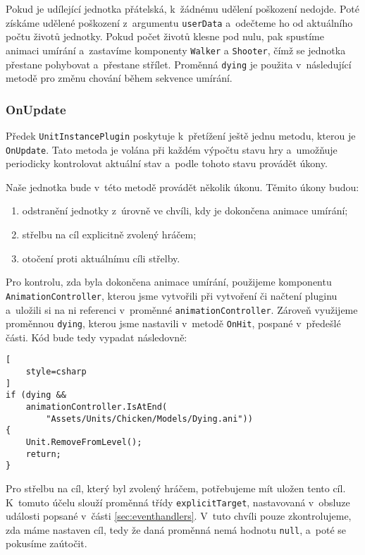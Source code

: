 Pokud je udílející jednotka přátelská, k~žádnému udělení poškození nedojde. Poté získáme udělené poškození z~argumentu \texttt{userData} a~odečteme ho od aktuálního počtu životů jednotky. Pokud počet životů klesne pod nulu, pak spustíme animaci umírání a~zastavíme komponenty \texttt{Walker} a \texttt{Shooter}, čímž se jednotka přestane pohybovat a~přestane střílet. Proměnná \texttt{dying} je použita v~následující metodě pro změnu chování během sekvence umírání.

\subsubsection{OnUpdate}
Předek \texttt{UnitInstancePlugin} poskytuje k~přetížení ještě jednu metodu, kterou je \texttt{OnUpdate}. Tato metoda je volána při každém výpočtu stavu hry a~umožňuje periodicky kontrolovat aktuální stav a~podle tohoto stavu provádět úkony.

Naše jednotka bude v~této metodě provádět několik úkonu. Těmito úkony budou:
\begin{enumerate}
	\item odstranění jednotky z~úrovně ve chvíli, kdy je dokončena animace umírání;
	\item střelbu na cíl explicitně zvolený hráčem;
	\item otočení proti aktuálnímu cíli střelby.
\end{enumerate}

Pro kontrolu, zda byla dokončena animace umírání, použijeme komponentu \texttt{AnimationController}, kterou jsme vytvořili při vytvoření či načtení pluginu a~uložili si na ni referenci v~proměnné \texttt{animationController}. Zároveň využijeme proměnnou \texttt{dying}, kterou jsme nastavili v~metodě \texttt{OnHit}, pospané v~předešlé části. Kód bude tedy vypadat následovně:

\begin{lstlisting}[
	style=csharp
]
if (dying && 
	animationController.IsAtEnd(
		"Assets/Units/Chicken/Models/Dying.ani")) 
{
	Unit.RemoveFromLevel();
	return;
}
\end{lstlisting}

Pro střelbu na cíl, který byl zvolený hráčem, potřebujeme mít uložen tento cíl. K~tomuto účelu slouží proměnná třídy \texttt{explicitTarget}, nastavovaná v~obsluze události popsané v~části \ref{sec:eventhandlers}. V~tuto chvíli pouze zkontrolujeme, zda máme nastaven cíl, tedy že daná proměnná nemá hodnotu \texttt{null}, a~poté se pokusíme zaútočit.

